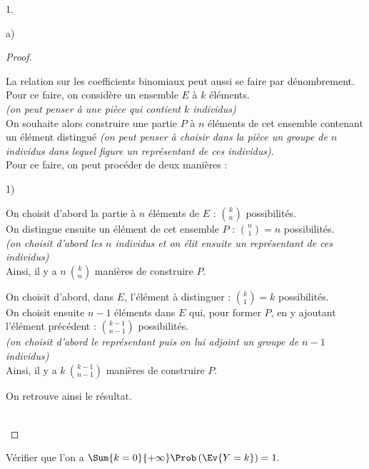 \documentclass[11pt]{article}%
\begin{document}
\begin{noliste}{1.}
\begin{noliste}{a)}
\begin{proof}
      \newpage


      \begin{remark}
        La relation sur les coefficients binomiaux peut aussi se
        faire par dénombrement.\\
        Pour ce faire, on considère un ensemble $E$ à $k$ éléments.\\
        {\it (on peut penser à une pièce qui contient $k$
          individus)}\\
        On souhaite alors construire une partie $P$ à $n$ éléments de
        cet ensemble contenant un élément distingué {\it (on peut
          penser à choisir dans la pièce un groupe de $n$ individus
          dans lequel figure un représentant de ces individus)}.\\
        Pour ce faire, on peut procéder de deux manières :
        \begin{noliste}{1)}
        \item On choisit d'abord la partie à $n$ éléments de $E$ :
          $\binom{k}{n}$ possibilités.\\[.1cm]
          On distingue ensuite un élément de cet ensemble $P$ :
          $\binom{n}{1} = n$ possibilités.\\
          {\it (on choisit d'abord les $n$ individus et on élit
            ensuite un représentant de ces individus)}\\[.1cm]
          Ainsi, il y a $n \ \binom{k}{n}$ manières de construire $P$.
          
        \item On choisit d'abord, dans $E$, l'élément à distinguer :
          $\binom{k}{1} = k$ possibilités.\\[.1cm]
          On choisit ensuite $n-1$ éléments dans $E$ qui, pour former
          $P$, en y ajoutant l'élément précédent : $\binom{k-1}{n-1}$
          possibilités.\\
          {\it (on choisit d'abord le représentant puis on lui adjoint
            un groupe de $n-1$ individus)}\\[.1cm]
          Ainsi, il y a $k \ \binom{k-1}{n-1}$ manières de construire
          $P$.
        \end{noliste}
        On retrouve ainsi le résultat.
      \end{remark}~\\[-1.4cm]
    \end{proof}
    
  \item Vérifier que l'on a $\Sum{k = 0}{+ \infty}\Prob\left(\Ev{Y =
        k}\right) = 1.$


\end{noliste}
\end{noliste}
\end{document}
